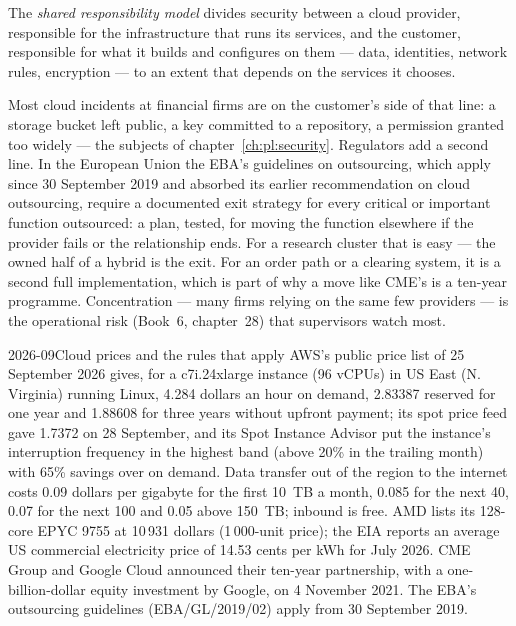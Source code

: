 \begin{definition}\label{def:pl:cloud-against-on-premises:shared}
The \emph{shared responsibility model} divides security between a cloud provider, responsible for the
infrastructure that runs its services, and the customer, responsible for what it builds and configures on them --- data, identities, network
rules, encryption --- to an extent that depends on the services it chooses.
\end{definition}

Most cloud incidents at financial firms are on the customer's side of that line: a storage bucket left public, a key committed to a repository,
a permission granted too widely --- the subjects of chapter~\ref{ch:pl:security}. Regulators add a second line. In the European Union the EBA's
guidelines on outsourcing, which apply since 30 September 2019 and absorbed its earlier recommendation on cloud outsourcing, require a
documented exit strategy for every critical or important function outsourced: a plan, tested, for moving the function elsewhere if the provider
fails or the relationship ends. For a research cluster that is easy --- the owned half of a hybrid is the exit. For an order path or a clearing
system, it is a second full implementation, which is part of why a move like CME's is a ten-year programme. Concentration --- many firms relying
on the same few providers --- is the operational risk (Book~6, chapter~28) that supervisors watch most.

\begin{dated}{2026-09}{Cloud prices and the rules that apply}\label{dat:pl:cloud-against-on-premises:prices}
AWS's public price list of 25 September 2026 gives, for a c7i.24xlarge instance (96 vCPUs) in US East (N. Virginia) running Linux, 4.284 dollars an
hour on demand, 2.83387 reserved for one year and 1.88608 for three years without upfront payment; its spot price feed gave 1.7372 on 28
September, and its Spot Instance Advisor put the instance's interruption frequency in the highest band (above 20\% in the trailing month) with
65\% savings over on demand. Data transfer out of the region to the internet costs 0.09 dollars per gigabyte for the first 10~TB a month, 0.085
for the next 40, 0.07 for the next 100 and 0.05 above 150~TB; inbound is free. AMD lists its 128-core EPYC 9755 at 10\,931 dollars (1\,000-unit
price); the EIA reports an average US commercial electricity price of 14.53 cents per kWh for July 2026. CME Group and Google Cloud announced
their ten-year partnership, with a one-billion-dollar equity investment by Google, on 4 November 2021. The EBA's outsourcing guidelines
(EBA/GL/2019/02) apply from 30 September 2019.
\end{dated}

